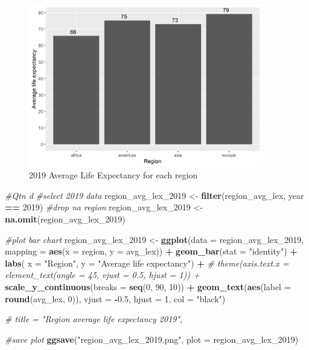 \documentclass[
]{article}
\newenvironment{Shaded}{\begin{snugshade}}{\end{snugshade}}
\newcommand{\AttributeTok}[1]{\textcolor[rgb]{0.13,0.29,0.53}{#1}}
\newcommand{\CommentTok}[1]{\textcolor[rgb]{0.56,0.35,0.01}{\textit{#1}}}
\newcommand{\DecValTok}[1]{\textcolor[rgb]{0.00,0.00,0.81}{#1}}
\newcommand{\FloatTok}[1]{\textcolor[rgb]{0.00,0.00,0.81}{#1}}
\newcommand{\FunctionTok}[1]{\textcolor[rgb]{0.13,0.29,0.53}{\textbf{#1}}}
\newcommand{\NormalTok}[1]{#1}
\newcommand{\OtherTok}[1]{\textcolor[rgb]{0.56,0.35,0.01}{#1}}
\newcommand{\SpecialCharTok}[1]{\textcolor[rgb]{0.81,0.36,0.00}{\textbf{#1}}}
\newcommand{\StringTok}[1]{\textcolor[rgb]{0.31,0.60,0.02}{#1}}
\begin{document}
\begin{figure}
\centering
\includegraphics[width=4.03125in,height=\textheight]{region_avg_lex_2019.png}
\caption{2019 Average Life Expectancy for each region}
\end{figure}

\begin{Shaded}
\begin{Highlighting}[]
\CommentTok{\#Qtn d}
\CommentTok{\#select 2019 data}
\NormalTok{region\_avg\_lex\_2019 }\OtherTok{\textless{}{-}} \FunctionTok{filter}\NormalTok{(region\_avg\_lex, year }\SpecialCharTok{==} \DecValTok{2019}\NormalTok{)}
\CommentTok{\#drop na region}
\NormalTok{region\_avg\_lex\_2019 }\OtherTok{\textless{}{-}} \FunctionTok{na.omit}\NormalTok{(region\_avg\_lex\_2019)}

\CommentTok{\#plot bar chart}
\NormalTok{region\_avg\_lex\_2019 }\OtherTok{\textless{}{-}} \FunctionTok{ggplot}\NormalTok{(}\AttributeTok{data =}\NormalTok{ region\_avg\_lex\_2019, }\AttributeTok{mapping =} \FunctionTok{aes}\NormalTok{(}\AttributeTok{x =}\NormalTok{ region, }\AttributeTok{y =}\NormalTok{ avg\_lex)) }\SpecialCharTok{+}
  \FunctionTok{geom\_bar}\NormalTok{(}\AttributeTok{stat =} \StringTok{"identity"}\NormalTok{) }\SpecialCharTok{+}
  \FunctionTok{labs}\NormalTok{(}
       \AttributeTok{x =} \StringTok{"Region"}\NormalTok{,}
       \AttributeTok{y =} \StringTok{"Average life expectancy"}\NormalTok{) }\SpecialCharTok{+}
  \CommentTok{\# theme(axis.text.x = element\_text(angle = 45, vjust = 0.5, hjust = 1)) +}
  \FunctionTok{scale\_y\_continuous}\NormalTok{(}\AttributeTok{breaks =} \FunctionTok{seq}\NormalTok{(}\DecValTok{0}\NormalTok{, }\DecValTok{90}\NormalTok{, }\DecValTok{10}\NormalTok{)) }\SpecialCharTok{+}
  \FunctionTok{geom\_text}\NormalTok{(}\FunctionTok{aes}\NormalTok{(}\AttributeTok{label =} \FunctionTok{round}\NormalTok{(avg\_lex, }\DecValTok{0}\NormalTok{)), }\AttributeTok{vjust =} \SpecialCharTok{{-}}\FloatTok{0.5}\NormalTok{, }\AttributeTok{hjust =} \DecValTok{1}\NormalTok{, }\AttributeTok{col =} \StringTok{"black"}\NormalTok{)}

\CommentTok{\# title = "Region average life expectancy 2019",}

\CommentTok{\#save plot}
\FunctionTok{ggsave}\NormalTok{(}\StringTok{"region\_avg\_lex\_2019.png"}\NormalTok{, }\AttributeTok{plot =}\NormalTok{ region\_avg\_lex\_2019)}
\end{Highlighting}
\end{Shaded}
\end{document}
